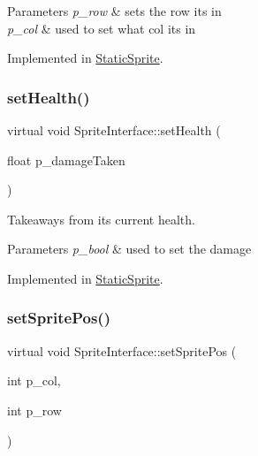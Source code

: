 \begin{DoxyParams}{Parameters}
{\em p\+\_\+row} & sets the row its in \\
\hline
{\em p\+\_\+col} & used to set what col its in \\
\hline
\end{DoxyParams}


Implemented in \mbox{\hyperlink{class_static_sprite_afe24127ebfb8a93de80fb42729a5f249}{Static\+Sprite}}.

\mbox{\label{class_sprite_interface_a56abad058843e3e4a7801f5b12cc6e18}} 
\subsubsection{\texorpdfstring{set\+Health()}{setHealth()}}
{\footnotesize\ttfamily virtual void Sprite\+Interface\+::set\+Health (\begin{DoxyParamCaption}\item[{float}]{p\+\_\+damage\+Taken }\end{DoxyParamCaption})\hspace{0.3cm}{\ttfamily [pure virtual]}}



Takeaways from its current health. 


\begin{DoxyParams}{Parameters}
{\em p\+\_\+bool} & used to set the damage \\
\hline
\end{DoxyParams}


Implemented in \mbox{\hyperlink{class_static_sprite_a975babf5d18d76c800a72a416558d7a4}{Static\+Sprite}}.

\mbox{\label{class_sprite_interface_a30511b7aaf2661d4f53db5b172dd365b}} 
\subsubsection{\texorpdfstring{set\+Sprite\+Pos()}{setSpritePos()}}
{\footnotesize\ttfamily virtual void Sprite\+Interface\+::set\+Sprite\+Pos (\begin{DoxyParamCaption}\item[{int}]{p\+\_\+col,  }\item[{int}]{p\+\_\+row }\end{DoxyParamCaption})\hspace{0.3cm}{\ttfamily [pure virtual]}}



